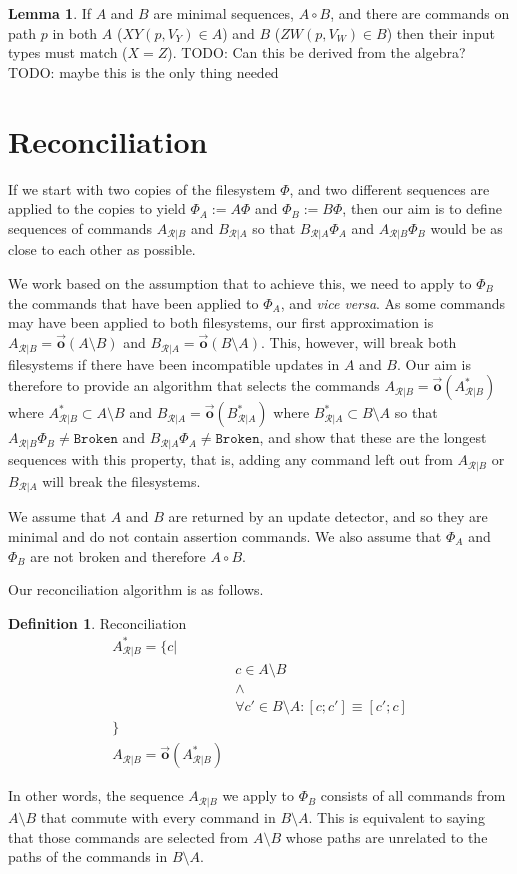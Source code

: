 \documentclass[12pt]{article}
\newcommand{\fsbroken}{\mathtt{Broken}} %
\newcommand{\FS}{\Phi} %
\newcommand{\fscommand}[2]{{#1#2}}
\newcommand{\cxy}{\fscommand{X}{Y}}
\newcommand{\czw}{\fscommand{Z}{W}}
\newcommand{\coworks}{\circ}
\newcommand{\ordered}[1]{\vec{\mathbf{o}}({#1})}
\newcommand{\recchar}[3]{{#1}^{#3}_{\mathcal{R}|{#2}}}
\newcommand{\reca}{\recchar{A}{B}{}} %
\newcommand{\recb}{\recchar{B}{A}{}}
\newcommand{\recaset}{\recchar{A}{B}{*}}
\newcommand{\recbset}{\recchar{B}{A}{*}}
\theoremstyle{definition}
\newtheorem{mydef}{Definition}
\newtheorem{mylem}{Lemma}
\begin{document}
\begin{mylem}\label{lemma:cowinputmatch}
If $A$ and $B$ are minimal sequences, $A\coworks B$,
and there are commands on path $p$ in both $A$ ($\cxy(p, V_Y)\in A$) and $B$ ($\czw(p, V_W)\in B$)
then their input types must match ($X=Z$).
TODO: Can this be derived from the algebra?
TODO: maybe this is the only thing needed
\end{mylem}

\section{Reconciliation}

If we start with two copies of the filesystem $\FS$,
and two different sequences are applied to the copies to yield $\FS_A:=A\FS$
and $\FS_B:=B\FS$, then our aim is to define sequences of commands $\reca$ and $\recb$
so that $\recb\FS_A$ and $\reca\FS_B$ would be as close to each other as possible.

We work based on the assumption that to achieve this, we need
to apply to $\FS_B$ the commands that have been applied to $\FS_A$, and \emph{vice versa}.
As some commands may have been applied to both filesystems, our first approximation
is $\reca = \ordered{A\setminus B}$ and $\recb = \ordered{B\setminus A}$.
This, however, will break both filesystems if there have been incompatible updates
in $A$ and $B$. 
Our aim is therefore to provide an algorithm that selects the commands 
$\reca = \ordered{\recaset}$  where $\recaset \subset A\setminus B$
and $\recb = \ordered{\recbset}$ where $\recbset \subset B\setminus A$ 
so that $\reca\FS_B\neq\fsbroken$ and $\recb\FS_A\neq\fsbroken$,
and show that these are the longest sequences with this property, that is,
adding any command left out from $\reca$ or $\recb$ will break the filesystems.

We assume that $A$ and $B$ are returned by an update detector,
and so they are minimal and do not contain assertion commands.
We also assume that $\FS_A$ and $\FS_B$ are not broken and therefore $A\coworks B$.

Our reconciliation algorithm is as follows.

\begin{mydef}{Reconciliation}\label{def:reconciliation}
\begin{align*}
\recaset = \{c| & \\
& c\in A\setminus B \\
& \wedge \\
& \forall c'\in B\setminus A: [c;c']\equiv[c';c]\\
\} & \\
\reca = \ordered{\recaset}&
\end{align*}

In other words, the sequence $\reca$ we apply to $\FS_B$ consists of all commands from $A\setminus B$
that commute with every command in $B\setminus A$.
This is equivalent to saying that those commands are selected from $A\setminus B$
whose paths are unrelated to the paths of the commands in $B\setminus A$.
\end{mydef}
\end{document}
